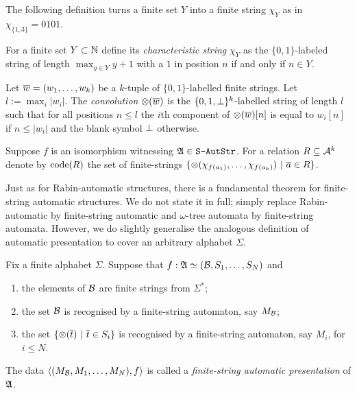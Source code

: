 The following definition turns a finite set $Y$ into a finite string $\chi_Y$ as in $\chi_{\{1,3\}} = 0101$.

\begin{definition}
For a finite set $Y \subset \mathbb{N}$ define
its {\em characteristic string} $\chi_Y$ as the $\{0,1\}$-labeled string of length $\max_{y \in Y} y + 1$ with a $1$ in position $n$ if and only if $n \in Y$.
\end{definition}


\begin{definition}
Let $\mbox{$\overline {w}$} = (w_1,\dots,w_k)$
be a $k$-tuple of $\{0,1\}$-labelled finite strings. Let $l:= \max_i |w_i|$.
The {\em convolution} $\otimes(\mbox{$\overline {w}$})$ is the $\{0,1,{\perp}\}^k$-labelled string of length $l$ such that for all positions $n \leq l$
the $i$th component of $\otimes(\mbox{$\overline {w}$})[n]$ is equal to $w_i[n]$ if $n \leq |w_i|$ and the blank symbol ${\perp}$ otherwise.
\end{definition} 


\begin{definition}
Suppose $f$ is an isomorphism witnessing $\mathfrak{A} \in \mbox{\tt S-AutStr}$. For a relation $R \subseteq {\mathcal A}^k$ denote by
${\rm code}({R})$ the set of finite-strings  $\{\otimes(\chi_{f(a_1)},\dots,\chi_{f(a_k)}) \ \vert \   \mbox{$\overline {a}$} \in R\}$. 
\end{definition}

Just as for Rabin-automatic structures, there is a fundamental theorem for finite-string automatic structures. We do not state it in full;
simply replace Rabin-automatic by finite-string automatic and $\omega$-tree automata by finite-string automata.
However, we do slightly generalise the analogous definition of automatic presentation to cover an arbitrary alphabet $\Sigma$.

\begin{definition} \label{AS:dfn:fsap}
Fix a finite alphabet $\Sigma$. Suppose that $f: \mathfrak{A} \simeq  ({\mathcal B},S_1,\dots,S_N)$ and
\begin{enumerate}
\item the elements of ${\mathcal B}$ are finite strings from $\Sigma^\ast$;
\item the set ${\mathcal B}$ is recognised by a finite-string automaton, say $M_{\mathcal B}$; 
\item the set $\{\otimes(\mbox{$\overline {t}$}) \ \vert \  \mbox{$\overline {t}$} \in S_i\}$ is recognised by a finite-string automaton, say $M_i$, for $i \leq N$.
\end{enumerate}
The data $\left<(M_{\mathcal B},M_1,\dots,M_N), f \right>$ is called a {\em finite-string automatic presentation} of $\mathfrak{A}$.
\end{definition}

